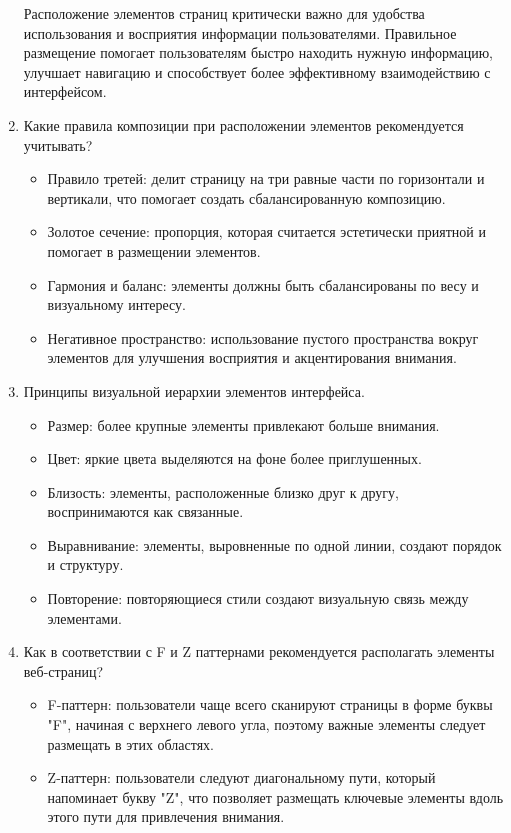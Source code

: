 \begin{enumerate}
    Расположение элементов страниц критически важно для удобства использования и восприятия информации пользователями. Правильное размещение помогает пользователям быстро находить нужную информацию, улучшает навигацию и способствует более эффективному взаимодействию с интерфейсом.
    \item Какие правила композиции при расположении элементов рекомендуется учитывать?
        \begin{itemize}
            \item Правило третей: делит страницу на три равные части по горизонтали и вертикали, что помогает создать сбалансированную композицию.
            \item Золотое сечение: пропорция, которая считается эстетически приятной и помогает в размещении элементов.
            \item Гармония и баланс: элементы должны быть сбалансированы по весу и визуальному интересу.
            \item Негативное пространство: использование пустого пространства вокруг элементов для улучшения восприятия и акцентирования внимания.
        \end{itemize}
    \item Принципы визуальной иерархии элементов интерфейса.
        \begin{itemize}
            \item Размер: более крупные элементы привлекают больше внимания.
            \item Цвет: яркие цвета выделяются на фоне более приглушенных.
            \item Близость: элементы, расположенные близко друг к другу, воспринимаются как связанные.
            \item Выравнивание: элементы, выровненные по одной линии, создают порядок и структуру.
            \item Повторение: повторяющиеся стили создают визуальную связь между элементами.
        \end{itemize}
    \item Как в соответствии с F и Z паттернами рекомендуется располагать элементы веб-страниц?
        \begin{itemize}
            \item F-паттерн: пользователи чаще всего сканируют страницы в форме буквы "F", начиная с верхнего левого угла, поэтому важные элементы следует размещать в этих областях.
            \item Z-паттерн: пользователи следуют диагональному пути, который напоминает букву "Z", что позволяет размещать ключевые элементы вдоль этого пути для привлечения внимания.

\end{itemize}
\end{enumerate}
